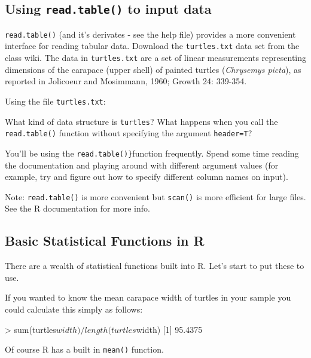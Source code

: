 \subsection{Using \lstinline!read.table()! to input data}

\lstinline!read.table()! (and it's derivates - see the help file)
provides a more convenient interface for reading tabular data. Download the \lstinline|turtles.txt| data set from the class wiki.  The data in \lstinline|turtles.txt| are a set of linear measurements representing dimensions of the carapace (upper shell) of painted turtles (\textit{Chrysemys picta}), as reported in Jolicoeur and Mosimmann, 1960; Growth 24: 339-354.

Using the
file \lstinline!turtles.txt!:

What kind of data structure is \lstinline!turtles!? What happens when
you call the \lstinline!read.table()! function without specifying the
argument \lstinline!header=T!?

You'll be using the \lstinline!read.table()}!function frequently. Spend
some time reading the documentation and playing around with different
argument values (for example, try and figure out how to specify
different column names on input).

Note: \lstinline!read.table()! is more convenient but \lstinline!scan()!
is more efficient for large files. See the R documentation for more
info.

\subsection{Basic Statistical Functions in R}

There are a wealth of statistical functions built into R. Let's start to
put these to use.

If you wanted to know the mean carapace width of turtles in your sample
you could calculate this simply as follows:

\begin{R}
> sum(turtles$width)/length(turtles$width)
[1] 95.4375
\end{R}
Of course R has a built in \lstinline!mean()! function.

